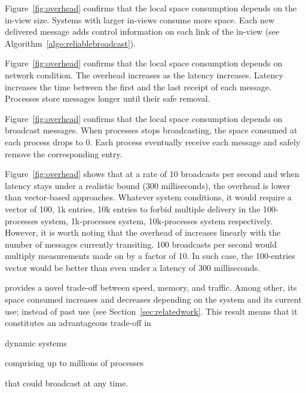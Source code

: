 \noindent Figure~\ref{fig:overhead} confirms that the local space consumption
  depends on the in-view size. Systems with larger in-views consume more
  space. Each new delivered message adds control information on each link of the
  in-view (see Algorithm~\ref{algo:reliablebroadcast}).

\noindent Figure~\ref{fig:overhead} confirms that the local space consumption
  depends on network condition. The overhead increases as the latency
  increases. Latency increases the time between the first and the last receipt
  of each message. Processes store messages longer until their safe removal.

\noindent Figure~\ref{fig:overhead} confirms that the local space consumption
  depends on broadcast messages. When processes stops broadcasting, the space
  consumed at each process drops to 0. Each process eventually receive each
  message and safely remove the corresponding entry.

\noindent Figure~\ref{fig:overhead} shows that at a rate of 10 broadcasts per second
  and when latency stays under a realistic bound ($300$ milliseconds), the overhead is
  lower than vector-based approaches. Whatever system conditions, it would
  require a vector of 100, 1k entries, 10k entries to forbid multiple delivery
  in the 100-processes system, 1k-processes system, 10k-processes system
  respectively. However, it is worth noting that the overhead of \RPCBROADCAST
  increases linearly with the number of messages currently transiting. 100
  broadcasts per second would multiply measurements made on \RPCBROADCAST by a
  factor of 10. In such case, the 100-entries vector would be better than
  \RPCBROADCAST even under a latency of $300$ milliseconds. 

\noindent \RPCBROADCAST provides a novel trade-off between speed, memory, and
traffic. Among other, its space consumed increases and decreases depending on
the system and its current use; instead of past use (see
Section~\ref{sec:relatedwork}. This result means that it constitutes an
advantageous trade-off in
\begin{inparaenum}[(i)]
\item dynamic systems
\item comprising up to millions of processes
\item that could broadcast at any time.
\end{inparaenum} \\

